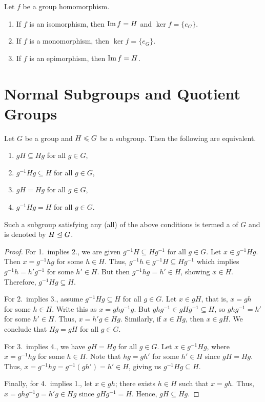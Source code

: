 \begin{remark}
    Let $f$ be a group homomorphism.
    \begin{enumerate}
        \item If $f$ is an isomorphism, then $\operatorname{Im} f = H$ and $\ker f = \{e_{G}\}$.
        \item If $f$ is a monomorphism, then $\ker f = \{e_{G}\}$.
        \item If $f$ is an epimorphism, then $\operatorname{Im} f = H$.
    \end{enumerate}
\end{remark}

\section{Normal Subgroups and Quotient Groups}

\begin{proposition}
    Let $G$ be a group and $H \leqslant G$ be a subgroup. Then the following are equivalent.
    \begin{enumerate}
        \item $gH \subseteq Hg$ for all $g \in G$,
        \item $g^{-1}Hg \subseteq H$ for all $g \in G$,
        \item $gH = Hg$ for all $g \in G$,
        \item $g^{-1}Hg = H$ for all $g \in G$.
    \end{enumerate}
\end{proposition}

Such a subgroup satisfying any (all) of the above conditions is termed a  of $G$ and is denoted by $H \trianglelefteq G$.

\begin{proof}
    For 1.~implies 2., we are given $g^{-1}H \subseteq Hg^{-1}$ for all $g \in G$. Let $x \in g^{-1}Hg$. Then $x = g^{-1}hg$ for some $h \in H$. Thus, $g^{-1}h \in g^{-1}H \subseteq Hg^{-1}$ which implies $g^{-1}h = h'g^{-1}$ for some $h' \in H$. But then $g^{-1}hg = h' \in H$, showing $x \in H$. Therefore, $g^{-1}Hg \subseteq H$.

    For 2.~implies 3., assume $g^{-1}Hg \subseteq H$ for all $g \in G$. Let $x \in gH$, that is, $x = gh$ for some $h \in H$. Write this as $x = ghg^{-1}g$. But $ghg^{-1} \in gHg^{-1} \subseteq H$, so $ghg^{-1} = h'$ for some $h' \in H$. Thus, $x = h'g \in Hg$. Similarly, if $x \in Hg$, then $x \in gH$. We conclude that $Hg = gH$ for all $g \in G$.

    For 3.~implies 4., we have $gH = Hg$ for all $g \in G$. Let $x \in g^{-1}Hg$, where $x = g^{-1}hg$ for some $h \in H$. Note that $hg = gh'$ for some $h' \in H$ since $gH = Hg$. Thus, $x = g^{-1}hg = g^{-1}(gh') = h' \in H$, giving us $g^{-1}Hg \subseteq H$.

    Finally, for 4.~implies 1., let $x \in gh$; there exists $h \in H$ such that $x = gh$. Thus, $x = ghg^{-1}g = h'g \in Hg$ since $gHg^{-1} = H$. Hence, $gH \subseteq Hg$.
\end{proof}

